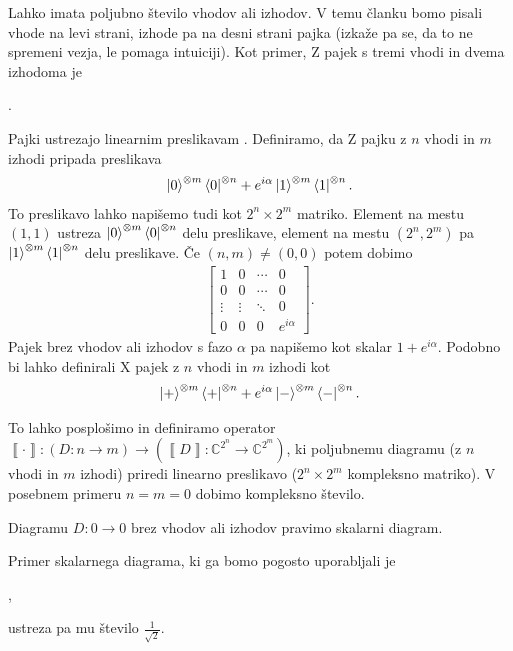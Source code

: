 \documentclass[mat1]{fmfdelo}
\newcommand{\C}{\mathbb C}
\newcommand{\interpret}[1]{\left\llbracket #1 \right\rrbracket}
\begin{document}
Lahko imata poljubno število vhodov ali izhodov. V temu članku bomo pisali vhode na levi strani, izhode pa na desni strani pajka (izkaže pa se, da to ne spremeni vezja, le pomaga intuiciji). Kot primer, Z pajek s tremi vhodi in dvema izhodoma je
\begin{center}
  .
\end{center}
Pajki ustrezajo linearnim preslikavam \cite[poglavje 1.1]{Backens}. Definiramo, da Z pajku z \(n\) vhodi in \(m\) izhodi pripada preslikava
\begin{align*}
    \ket{0}^{\otimes m} \bra{0}^{\otimes n} + e^{i\alpha}\ket{1}^{\otimes m} \bra{1}^{\otimes n}.
\end{align*}
To preslikavo lahko napišemo tudi kot \(2^n\times 2^m\) matriko. Element na mestu \((1,1)\) ustreza \(\ket{0}^{\otimes m} \bra{0}^{\otimes n}\) delu preslikave, element na mestu \((2^n, 2^m)\) pa \(\ket{1}^{\otimes m} \bra{1}^{\otimes n}\) delu preslikave. Če \((n,m)\neq (0,0)\) potem dobimo
\begin{align*}
    \begin{bmatrix}
        1 & 0 & \cdots & 0 \\
        0 & 0 & \cdots & 0 \\
        \vdots & \vdots & \ddots & 0 \\
        0 & 0 & 0 & e^{i\alpha} 
        \end{bmatrix}.
\end{align*}
Pajek brez vhodov ali izhodov s fazo \(\alpha\) pa napišemo kot skalar \(1+e^{i\alpha}\).
Podobno bi lahko definirali X pajek z \(n\) vhodi in \(m\) izhodi \cite[Poglavje 3.1]{workingcs} kot
\begin{align*}
    \ket{+}^{\otimes m} \bra{+}^{\otimes n} + e^{i\alpha}\ket{-}^{\otimes m} \bra{-}^{\otimes n}.
\end{align*}

To lahko posplošimo in definiramo operator \(\interpret{\cdot}: (D:n\to m)\to (\interpret{D}: \C^{2^n} \to \C^{2^m})\), ki poljubnemu diagramu (z \(n\) vhodi in \(m\) izhodi) priredi linearno preslikavo (\(2^n\times 2^m\) kompleksno matriko). V posebnem primeru \(n=m=0\) dobimo kompleksno število.
\begin{definicija}
    Diagramu \(D:0\to0\) brez vhodov ali izhodov pravimo skalarni diagram.
\end{definicija}
Primer skalarnega diagrama, ki ga bomo pogosto uporabljali je 
\begin{center}
    ,
\end{center}
ustreza pa mu število \(\frac{1}{\sqrt 2}\).
\end{document}
